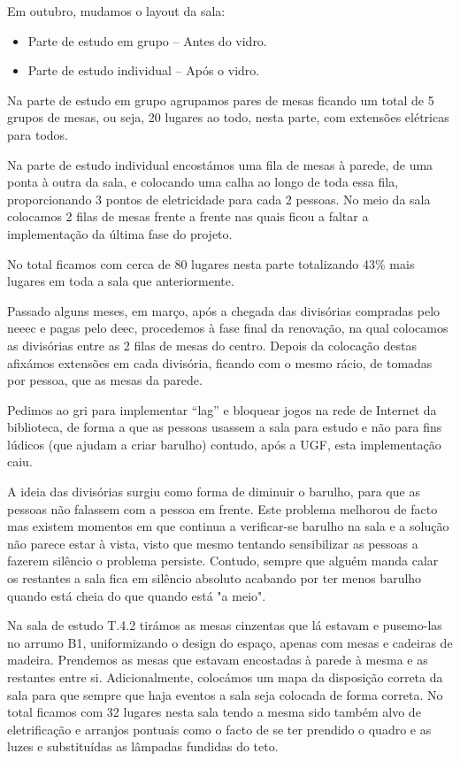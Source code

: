 Em outubro, mudamos o layout da sala:
\begin{itemize}
\item Parte de estudo em grupo – Antes do vidro.
\item Parte de estudo individual – Após o vidro.
\end{itemize}

Na parte de estudo em grupo agrupamos pares de mesas ficando um total de 5 grupos de mesas, ou seja, 20 lugares ao todo, nesta parte, com extensões elétricas para todos.

Na parte de estudo individual encostámos uma fila de mesas à parede, de uma ponta à outra da sala, e colocando uma calha ao longo de toda essa fila, proporcionando 3 pontos de eletricidade para cada 2 pessoas. No meio da sala colocamos 2 filas de mesas frente a frente nas quais ficou a faltar a implementação da última fase do projeto.

No total ficamos com cerca de 80 lugares nesta parte totalizando 43\% mais lugares em toda a sala que anteriormente.

Passado alguns meses, em março, após a chegada das divisórias compradas pelo \acrshort{neeec} e pagas pelo \acrshort{deec}, procedemos à fase final da renovação, na qual colocamos as divisórias entre as 2 filas de mesas do centro. Depois da colocação destas afixámos extensões em cada divisória, ficando com o mesmo rácio, de tomadas por pessoa, que as mesas da parede.

Pedimos ao \acrshort{gri} para implementar “lag” e bloquear jogos na rede de Internet da biblioteca, de forma a que as pessoas usassem a sala para estudo e não para fins lúdicos (que ajudam a criar barulho) contudo, após a UGF, esta implementação caiu.

A ideia das divisórias surgiu como forma de diminuir o barulho, para que as pessoas não falassem com a pessoa em frente. Este problema melhorou de facto mas existem momentos em que continua a verificar-se barulho na sala e a solução não parece estar à vista, visto que mesmo tentando sensibilizar as pessoas a fazerem silêncio o problema persiste. Contudo, sempre que alguém manda calar os restantes a sala fica em silêncio absoluto acabando por ter menos barulho quando está cheia do que quando está "a meio".

Na sala de estudo T.4.2 tirámos as mesas cinzentas que lá estavam e pusemo-las no arrumo B1, uniformizando o design do espaço, apenas com mesas e cadeiras de madeira. Prendemos as mesas que estavam encostadas à parede à mesma e as restantes entre si. Adicionalmente, colocámos um mapa da disposição correta da sala para que sempre que haja eventos a sala seja colocada de forma correta. No total ficamos com 32 lugares nesta sala tendo a mesma sido também alvo de eletrificação e arranjos pontuais como o facto de se ter prendido o quadro e as luzes e substituídas as lâmpadas fundidas do teto.

